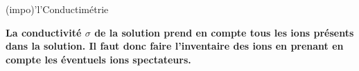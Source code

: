 \documentclass[../main/main.tex]{subfiles}
\begin{document}
{	\begin{tcb}(impo)'l'{Conductimétrie}
		\begin{center}
			\bfseries
			La conductivité $\sigma$ de la solution prend en compte tous les ions
			présents dans la solution. Il faut donc faire l'inventaire des ions en
			prenant en compte les éventuels ions spectateurs.
		\end{center}
	\end{tcb}

}

\setcounter{section}{2}
\end{document}
